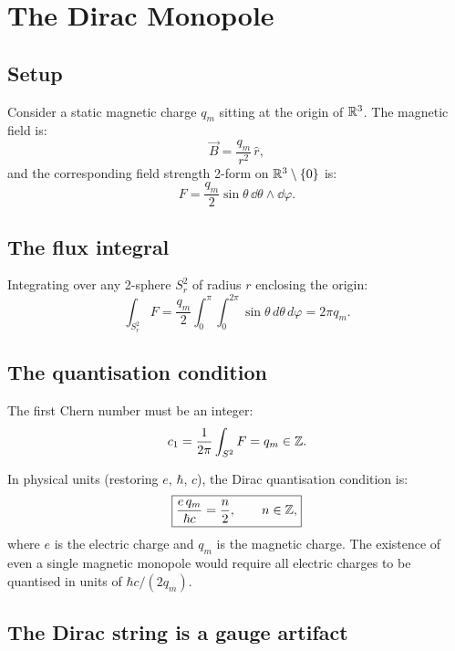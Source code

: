 \section{The Dirac Monopole}

\subsection{Setup}

Consider a static magnetic charge $q_m$ sitting at the origin of $\mathbb{R}^3$. The magnetic field is:
\begin{equation}
\vec{B} = \frac{q_m}{r^2}\,\hat{r},
\end{equation}
and the corresponding field strength 2-form on $\mathbb{R}^3 \setminus \{0\}$ is:
\begin{equation}
F = \frac{q_m}{2}\sin\theta\,\dd\theta \wedge \dd\varphi.
\end{equation}

\subsection{The flux integral}

Integrating over any 2-sphere $S^2_r$ of radius $r$ enclosing the origin:
\begin{equation}
\int_{S^2_r} F = \frac{q_m}{2}\int_0^\pi\int_0^{2\pi}\sin\theta\,d\theta\,d\varphi = 2\pi q_m.
\end{equation}

\subsection{The quantisation condition}

The first Chern number must be an integer:
\begin{equation}
c_1 = \frac{1}{2\pi}\int_{S^2} F = q_m \in \mathbb{Z}.
\end{equation}

In physical units (restoring $e$, $\hbar$, $c$), the Dirac quantisation condition is:
\begin{equation}
\boxed{\frac{e\,q_m}{\hbar c} = \frac{n}{2}, \qquad n \in \mathbb{Z},}
\end{equation}
where $e$ is the electric charge and $q_m$ is the magnetic charge. The existence of even a single magnetic monopole would require all electric charges to be quantised in units of $\hbar c / (2q_m)$.

\subsection{The Dirac string is a gauge artifact}

